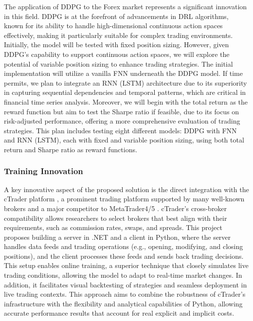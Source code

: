 The application of DDPG to the Forex market represents a significant innovation in this field. DDPG is at the forefront of advancements in DRL algorithms, known for its ability to handle high-dimensional continuous action spaces effectively, making it particularly suitable for complex trading environments. Initially, the model will be tested with fixed position sizing. However, given DDPG's capability to support continuous action spaces, we will explore the potential of variable position sizing to enhance trading strategies. The initial implementation will utilize a vanilla FNN underneath the DDPG model. If time permits, we plan to integrate an RNN (LSTM) architecture due to its superiority in capturing sequential dependencies and temporal patterns, which are critical in financial time series analysis. Moreover, we will begin with the total return as the reward function but aim to test the Sharpe ratio if feasible, due to its focus on risk-adjusted performance, offering a more comprehensive evaluation of trading strategies. This plan includes testing eight different models: DDPG with FNN and RNN (LSTM), each with fixed and variable position sizing, using both total return and Sharpe ratio as reward functions.

\subsubsection{Training Innovation}

A key innovative aspect of the proposed solution is the direct integration with the cTrader platform \cite{noauthor_forex_nodate}, a prominent trading platform supported by many well-known brokers and a major competitor to MetaTrader4/5 \cite{noauthor_metatrader_nodate}. cTrader’s cross-broker compatibility allows researchers to select brokers that best align with their requirements, such as commission rates, swaps, and spreads. This project proposes building a server in .NET and a client in Python, where the server handles data feeds and trading operations (e.g., opening, modifying, and closing positions), and the client processes these feeds and sends back trading decisions. This setup enables online training, a superior technique that closely simulates live trading conditions, allowing the model to adapt to real-time market changes. In addition, it facilitates visual backtesting of strategies and seamless deployment in live trading contexts. This approach aims to combine the robustness of cTrader’s infrastructure with the flexibility and analytical capabilities of Python, allowing accurate performance results that account for real explicit and implicit costs.

